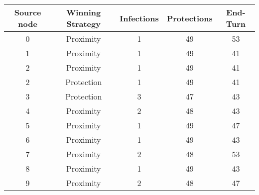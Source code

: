 \documentclass[results.tex]{subfiles}
\begin{document}
    \begin{center}
        \begin{tabular}{| c || c | c | c | c |}
            \hline
            {\bfseries Source node} & {\bfseries Winning Strategy} & {\bfseries Infections} & {\bfseries Protections}
            & {\bfseries End-Turn}
            \\  %
            \hline\hline
            0                       & Proximity                    & 1                      & 49                      & 53                   \\
            \hline
            1                       & Proximity                    & 1                      & 49                      & 41                   \\
            \hline
            2                       & Proximity                    & 1                      & 49                      & 41                   \\
            \hline
            2                       & Protection                   & 1                      & 49                      & 41                   \\
            \hline
            3                       & Protection                   & 3                      & 47                      & 43                   \\
            \hline
            4                       & Proximity                    & 2                      & 48                      & 43                   \\
            \hline
            5                       & Proximity                    & 1                      & 49                      & 47                   \\
            \hline
            6                       & Proximity                    & 1                      & 49                      & 43                   \\
            \hline
            7                       & Proximity                    & 2                      & 48                      & 53                   \\
            \hline
            8                       & Proximity                    & 1                      & 49                      & 43                   \\
            \hline
            9                       & Proximity                    & 2                      & 48                      & 47                   \\

\end{tabular}
\end{center}
\end{document}
